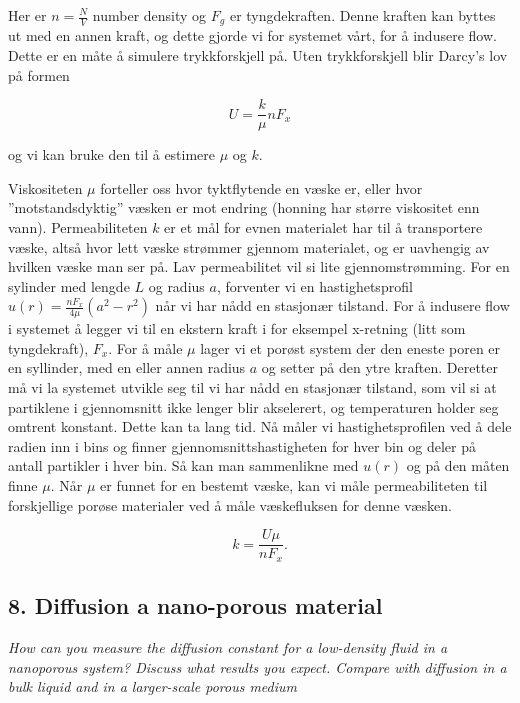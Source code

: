 \documentclass[a4paper,10pt]{article}
\begin{document}
Her er $n=\frac{N}{V}$ number density og $F_g$ er tyngdekraften. Denne kraften kan byttes ut med en annen kraft, og dette gjorde vi for systemet vårt, for å indusere flow. Dette er en måte å simulere trykkforskjell på. Uten trykkforskjell blir Darcy's lov på formen

\begin{equation}
 U = \frac{k}{\mu}nF_x
\end{equation}

og vi kan bruke den til å estimere $\mu$ og $k$. 

Viskositeten $\mu$ forteller oss hvor tyktflytende en væske er, eller hvor ”motstandsdyktig” væsken er mot endring (honning har større viskositet enn vann). Permeabiliteten $k$ er et mål for evnen materialet har til å transportere væske, altså hvor lett væske strømmer gjennom materialet, og er uavhengig av hvilken væske man ser på. Lav permeabilitet vil si lite gjennomstrømming. For en sylinder med lengde $L$ og radius $a$, forventer vi en hastighetsprofil $u(r) = \frac{nF_x}{4\mu}(a^2 - r^2)$ når vi har nådd en stasjonær tilstand. 
For å indusere flow i systemet å legger vi til en ekstern kraft i for eksempel x-retning (litt som tyngdekraft), $F_x$. For å måle $\mu$ lager vi et porøst system der den eneste poren er en syllinder, med en eller annen radius $a$ og setter på den ytre kraften. Deretter må vi la systemet utvikle seg til vi har nådd en stasjonær tilstand, som vil si at partiklene i gjennomsnitt ikke lenger blir akselerert, og temperaturen holder seg omtrent konstant. Dette kan ta lang tid. Nå måler vi hastighetsprofilen ved å dele radien inn i bins og finner gjennomsnittshastigheten for hver bin og deler på antall partikler i hver bin. Så kan man sammenlikne med $u(r)$ og på den måten finne $\mu$. Når $\mu$ er funnet for en bestemt væske, kan vi måle permeabiliteten til forskjellige porøse materialer ved å måle væskefluksen for denne væsken.

\begin{equation}
 k = \frac{U\mu}{nF_x}.
\end{equation}


\subsection*{8. Diffusion a nano-porous material}
\textit{How can you measure the diffusion constant for a low-density fluid in a nanoporous
system? Discuss what results you expect. Compare with diffusion in a bulk liquid and in a larger-scale porous medium}
\end{document}
